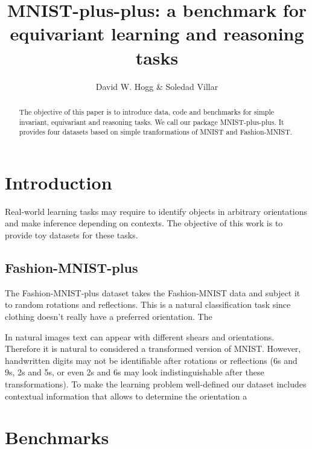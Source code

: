 \documentclass{article}
\title{\bfseries MNIST-plus-plus: a benchmark for equivariant learning and reasoning tasks}
\author{David W. Hogg \& Soledad Villar}
\date{}
\begin{document}
\maketitle

\begin{abstract}\noindent
    The objective of this paper is to introduce data, code and benchmarks for simple invariant, equivariant and reasoning tasks. We call our package MNIST-plus-plus. It provides four datasets based on simple tranformations of MNIST and Fashion-MNIST.
\end{abstract}

\section{Introduction}

Real-world learning tasks may require to identify objects in arbitrary orientations and make inference depending on contexts. The objective of this work is to provide toy datasets for these tasks. 

\subsection{Fashion-MNIST-plus}
The Fashion-MNIST-plus dataset takes the Fashion-MNIST data and subject it to random rotations and reflections. This is a natural classification task since clothing doesn't really have a preferred orientation.
The 

In natural images text can appear with different shears and orientations. Therefore it is natural to considered a transformed version of MNIST. However, handwritten digits may not be identifiable after rotations or reflections (6s and 9s, 2s and 5s, or even 2s and 6s may look indistinguishable after these transformations). To make the learning problem well-defined our dataset includes contextual information that allows to determine the orientation a

\section{Benchmarks}

\section{}
\end{document}

